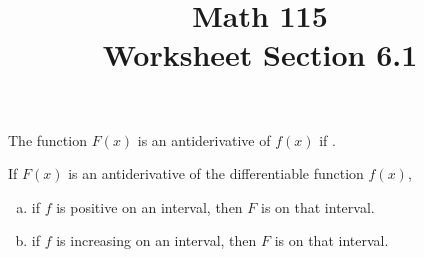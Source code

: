 \documentclass[11pt]{exam}
\title{\vspace{-0.75in} Math 115 \\ Worksheet Section 6.1}
\date{}
\begin{document}
\maketitle
\vspace{-0.5in}
\noindent The function $F(x)$ is an antiderivative of $f(x)$ if \fillin[\(F'(x)
= f(x)\)][4cm].

\vspace{0.5cm}

\noindent If $F(x)$ is an antiderivative of the differentiable function $f(x)$,
	\begin{enumerate}[(a)]
		\item if $f$ is positive on an interval, then $F$ is \fillin[increasing][4cm] on that interval.
		\item if $f$ is increasing on an interval, then $F$ is
                  \fillin[concave up][4cm] on that interval.
	\end{enumerate}
\end{document}
